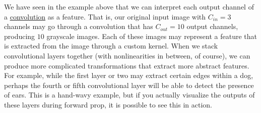   We have seen in the example above that we can interpret each output channel of a \hyperref[prob-def:convolution]{convolution} as a feature. That is, our original input image with $C_{in} = 3$ channels may go through a convolution that has $C_{out} = 10$ output channels, producing $10$ grayscale images. Each of these images may represent a feature that is extracted from the image through a custom kernel. When we stack convolutional layers together (with nonlinearities in between, of course), we can produce more complicated transformations that extract more abstract features. For example, while the first layer or two may extract certain edges within a dog, perhaps the fourth or fifth convolutional layer will be able to detect the presence of ears. This is a hand-wavy example, but if you actually visualize the outputs of these layers during forward prop, it is possible to see this in action.  

